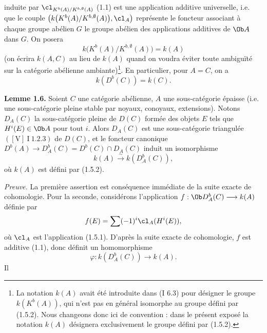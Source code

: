 induite par \(\cl_{K^b(A)/K^{b,\emptyset}(A)}\) (1.1) est une application additive universelle, i.e. que le couple \(\left(k\bigl(K^b(A)/K^{b,\emptyset}(A)\bigr),\cl_A\right)\) représente le foncteur associant à chaque groupe abélien \(G\) le groupe abélien des applications additives de \(\Ob A\) dans \(G\). On posera
\begin{equation}\tag{1.5.2}
 k\bigl(K^b(A)/K^{b,\emptyset}(A)\bigr)=k(A)
\end{equation}
(on écrira \(k(A,C)\) au lieu de \(k(A)\) quand on voudra éviter toute ambiguïté sur la catégorie abélienne ambiante)\footnote{La notation \(k(A)\) avait été introduite dans (I 6.3) pour désigner le groupe \(k(K^b(A))\), qui n'est pas en général isomorphe au groupe défini par (1.5.2). Nous changeons donc ici de convention : dans le présent exposé la notation \(k(A)\) désignera exclusivement le groupe défini par (1.5.2).}.
En particulier, pour \(A=C\), on a
\begin{equation}\tag{1.5.3}
 k(D^b(C))=k(C).
\end{equation}

\textbf{Lemme 1.6.} Soient \(C\) une catégorie abélienne, \(A\) une sous-catégorie épaisse (i.e. une sous-catégorie pleine stable par noyaux, conoyaux, extensions). Notons \(D_A(C)\) la sous-catégorie pleine de \(D(C)\) formée des objets \(E\) tels que \(H^i(E)\in\Ob A\) pour tout \(i\). Alors \(D_A(C)\) est une sous-catégorie triangulée \(([\mathrm V]\ \mathrm I\ 1.2.3)\) de \(D(C)\), et le foncteur canonique \(D^b(A)\longrightarrow D_A^b(C)=D^b(C)\cap D_A(C)\) induit un isomorphisme
\[
 k(A)\xrightarrow{\sim} k(D_A^b(C)),
\]
où \(k(A)\) est défini par (1.5.2).

\emph{Preuve.} La première assertion est conséquence immédiate de la suite exacte de cohomologie. Pour la seconde, considérons l'application \(f:\Ob D_A^b(C)\longrightarrow k(A)\) définie par
\[
 f(E)=\sum(-1)^i\cl_A(H^i(E)),
\]
où \(\cl_A\) est l'application (1.5.1). D'après la suite exacte de cohomologie, \(f\) est additive (1.1), donc définit un homomorphisme
\[
 \varphi:k(D_A^b(C))\longrightarrow k(A).
\]
Il
